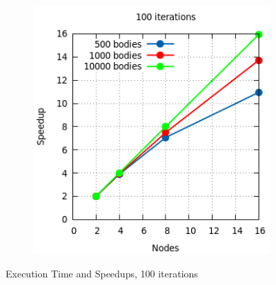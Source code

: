 \documentclass[a4paper]{article}
\begin{document}
\begin{figure}[ht]
\begin{subfigure}{.5\textwidth}
\end{subfigure} %
\begin{subfigure}{.5\textwidth}
  \centering
  \includegraphics[width=1\linewidth]{results/100_sp}
\end{subfigure} 
  \caption{Execution Time and Speedups, 100 iterations}
  \label{fig:R2}
\end{figure}
\FloatBarrier
\end{document}
